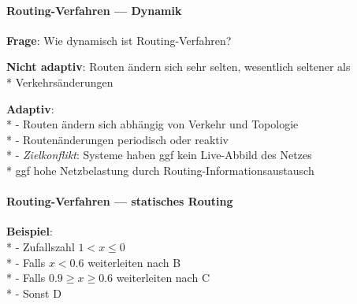 \paragraph{Routing-Verfahren --- Dynamik}
\begin{items}
  \item \textbf{Frage}: Wie dynamisch ist Routing-Verfahren?
  \item \textbf{Nicht adaptiv}: Routen ändern sich sehr selten, wesentlich seltener als \\* Verkehrsänderungen
  \item \textbf{Adaptiv}: \\*
    - Routen ändern sich abhängig von Verkehr und Topologie \\*
    - Routenänderungen periodisch oder reaktiv \\*
    - \emph{Zielkonflikt}: Systeme haben ggf kein Live-Abbild des Netzes \\*
      \phantom{-} \phantom{\( \cdot \)} ggf hohe Netzbelastung durch Routing-Informationsaustausch
\end{items}

\paragraph{Routing-Verfahren --- statisches Routing}
\begin{items}
  \item \textbf{Beispiel}: \\*
    - Zufallszahl \( 1 < x \leq 0 \) \\*
    - Falls \( x < 0.6 \) weiterleiten nach B \\*
    - Falls \( 0.9 \geq x \geq 0.6 \) weiterleiten nach C \\*
    - Sonst D
\end{items}


